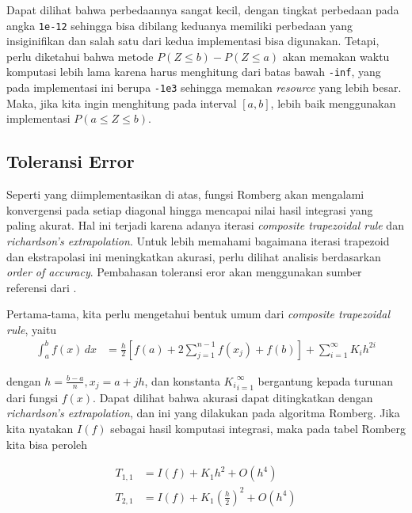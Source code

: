 \documentclass[journal,12pt,onecolumn,a4paper]{IEEEtran}
\begin{document}
Dapat dilihat bahwa perbedaannya sangat kecil, dengan tingkat perbedaan pada angka \lstinline{1e-12} sehingga bisa dibilang keduanya memiliki perbedaan yang insiginifikan dan salah satu dari kedua implementasi bisa digunakan. Tetapi, perlu diketahui bahwa metode \(P(Z \le b ) - P(Z \le a )\) akan memakan waktu komputasi lebih lama karena harus menghitung dari batas bawah \lstinline{-inf}, yang pada implementasi ini berupa \lstinline{-1e3} sehingga memakan \emph{resource} yang lebih besar. Maka, jika kita ingin menghitung pada interval \([a,b]\), lebih baik menggunakan implementasi \(P(a \le Z \le b)\).

\subsection{Toleransi Error}
Seperti yang diimplementasikan di atas, fungsi Romberg akan mengalami konvergensi pada setiap diagonal hingga mencapai nilai hasil integrasi yang paling akurat. Hal ini terjadi karena adanya iterasi \emph{composite trapezoidal rule} dan \emph{richardson's extrapolation}. Untuk lebih memahami bagaimana iterasi trapezoid dan ekstrapolasi ini meningkatkan akurasi, perlu dilihat analisis berdasarkan \emph{order of accuracy}. Pembahasan toleransi eror akan menggunakan sumber referensi dari \cite{jim_lamber}.

Pertama-tama, kita perlu mengetahui bentuk umum dari \emph{composite trapezoidal rule}, yaitu
\begin{equation*}
	\begin{split}
		\int_{a}^{b} f(x) \,dx & = \frac{h}{2}[f(a)+2\sum_{j=1}^{n-1}f(x_j)+f(b)]+\sum_{i=1}^{\infty}K_ih^{2i}
	\end{split}
\end{equation*}

dengan \(h=\frac{b-a}{n}, x_j = a+jh\), dan konstanta \({K_i}_{i=1}^{\infty}\) bergantung kepada turunan dari fungsi \(f(x)\). Dapat dilihat bahwa akurasi dapat ditingkatkan dengan \emph{richardson's extrapolation}, dan ini yang dilakukan pada algoritma Romberg.
Jika kita nyatakan \(I(f)\) sebagai hasil komputasi integrasi, maka pada tabel Romberg kita bisa peroleh

\begin{equation*}
	\begin{split}
		T_{1,1} & = I(f) + K_1h^2 +O(h^4) \\
		T_{2,1} & = I(f) + K_1(\frac{h}{2})^2 + O(h^4)
	\end{split}
\end{equation*}
\end{document}

